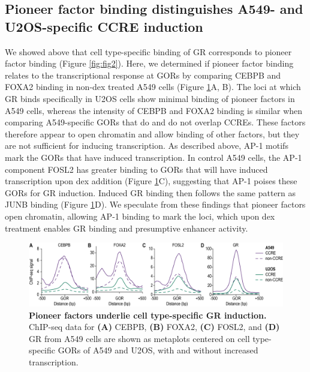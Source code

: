 \documentclass{article}
\begin{document}
{\clearpage

\subsection*{Pioneer factor binding distinguishes A549- and U2OS-specific CCRE induction}

We showed above that cell type-specific binding of GR corresponds to pioneer factor binding (Figure \ref{fig:fig2}). Here, we determined if pioneer factor binding relates to the transcriptional response at GORs by comparing CEBPB and FOXA2 binding in non-dex treated A549 cells (Figure \ref{fig:fig6}A, B). The loci at which GR binds specifically in U2OS cells show minimal binding of pioneer factors in A549 cells, whereas the intensity of CEBPB and FOXA2 binding is similar when comparing A549-specific GORs that do and do not overlap CCREs. These factors therefore appear to open chromatin and allow binding of other factors, but they are not sufficient for inducing transcription. As described above, AP-1 motifs mark the GORs that have induced transcription. In control A549 cells, the AP-1 component FOSL2 has greater binding to GORs that will have induced transcription upon dex addition (Figure \ref{fig:fig6}C), suggesting that AP-1 poises these GORs for GR induction. Induced GR binding then follows the same pattern as JUNB binding (Figure \ref{fig:fig6}D). We speculate from these findings that pioneer factors open chromatin, allowing AP-1 binding to mark the loci, which upon dex treatment enables GR binding and presumptive enhancer activity.

\begin{figure}[ht]
\includegraphics[width=\textwidth]{figures/Figure6_v2.png}
\caption{\textbf{Pioneer factors underlie cell type-specific GR induction.} ChIP-seq data for \textbf{(A)} CEBPB, \textbf{(B)} FOXA2, \textbf{(C)} FOSL2, and \textbf{(D)} GR from A549 cells are shown as metaplots centered on cell type-specific GORs of A549 and U2OS, with and without increased transcription.}
\label{fig:fig6}
\end{figure}

}
\end{document}
